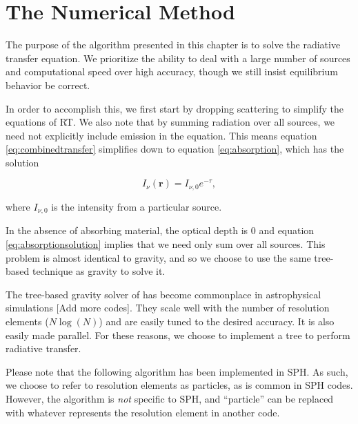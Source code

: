 \pagestyle{fancy}
\headheight 20pt
\chead{}
\lfoot{}
\cfoot{\thepage}
\rfoot{}
\renewcommand{\headrulewidth}{0.1pt}
\renewcommand{\footrulewidth}{0.1pt}

\chapter{The Numerical Method}
\label{chap:method}
\thispagestyle{fancy}

The purpose of the algorithm presented in this chapter is to solve the radiative transfer equation. We prioritize the ability to deal with a large number of sources and computational speed over high accuracy, though we still insist equilibrium behavior be correct.

In order to accomplish this, we first start by dropping scattering to simplify the equations of RT. We also note that by summing radiation over all sources, we need not explicitly include emission in the equation. This means equation \ref{eq:combinedtransfer} simplifies down to equation \ref{eq:absorption}, which has the solution

\begin{equation}
\label{eq:absorptionsolution}
I_{\nu}(\mathbf{r}) = I_{\nu,0}e^{-\tau},
\end{equation}

\noindent
where $I_{\nu,0}$ is the intensity from a particular source.


In the absence of absorbing material, the optical depth is 0 and equation \ref{eq:absorptionsolution} implies that we need only sum over all sources. This problem is almost identical to gravity, and so we choose to use the same tree-based technique as gravity to solve it.

The tree-based gravity solver of \citet{barnesHut86} has become commonplace in astrophysical simulations \citep{osheaEt04,wadsleyEt03,springelEt01}[Add more codes]. They scale well with the number of resolution elements ($N\log(N)$) and are easily tuned to the desired accuracy. It is also easily made parallel. For these reasons, we choose to implement a tree to perform radiative transfer.

Please note that the following algorithm has been implemented in SPH. As such, we choose to refer to resolution elements as particles, as is common in SPH codes. However, the algorithm is \emph{not} specific to SPH, and ``particle'' can be replaced with whatever represents the resolution element in another code.

